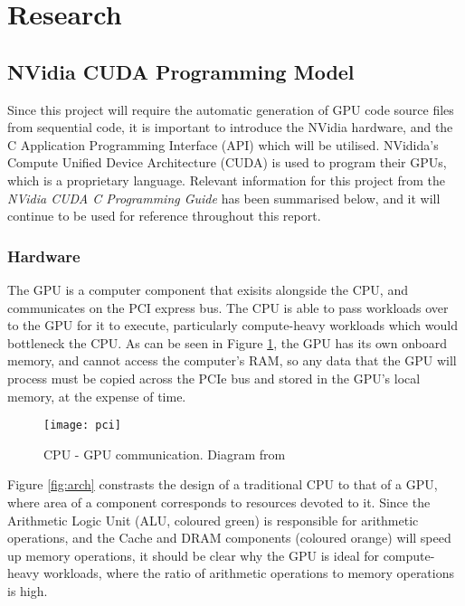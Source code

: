 
\section{Research}
\label{s:research}

\subsection{NVidia CUDA Programming Model}
Since this project will require the automatic generation of GPU code source files from sequential code, it is important to introduce the NVidia hardware, and the C Application Programming Interface (API) which will be utilised. NVidida's Compute Unified Device Architecture (CUDA) is used to program their GPUs, which is a proprietary language. Relevant information for this project from the \textit{NVidia CUDA C Programming Guide} \cite{guide} has been summarised below, and it will continue to be used for reference throughout this report.

\subsubsection{Hardware}
The GPU is a computer component that exisits alongside the CPU, and communicates on the PCI express bus. The CPU is able to pass workloads over to the GPU for it to execute, particularly compute-heavy workloads which would bottleneck the CPU. As can be seen in Figure \ref{fig:pci}, the GPU has its own onboard memory, and cannot access the computer's RAM, so any data that the GPU will process must be copied across the PCIe bus and stored in the GPU's local memory, at the expense of time.

\begin{figure}[h!]
  \centering
  \texttt{[image: pci]}
  \caption{\label{fig:pci} CPU - GPU communication. Diagram from \cite{nvlink}}
\end{figure}

\par
Figure \ref{fig:arch} constrasts the design of a traditional CPU to that of a GPU, where area of a component corresponds to resources devoted to it. Since the Arithmetic Logic Unit (ALU, coloured green) is responsible for arithmetic operations, and the Cache and DRAM components (coloured orange) will speed up memory operations, it should be clear why the GPU is ideal for compute-heavy workloads, where the ratio of arithmetic operations to memory operations is high.

